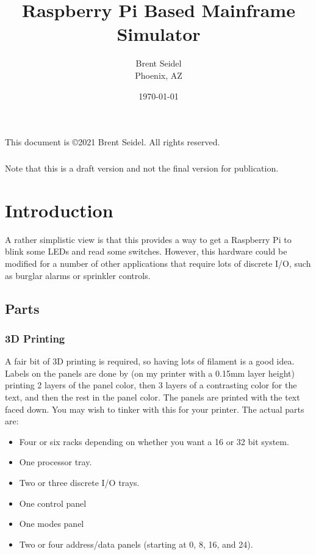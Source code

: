 \documentclass[10pt, openany]{book}
\title{Raspberry Pi Based Mainframe Simulator}
\author{Brent Seidel \\ Phoenix, AZ}
\date{ \today }
\begin{document}
%
%
\frontmatter
\maketitle
\begin{center}
This document is \copyright 2021 Brent Seidel.  All rights reserved.

\paragraph{}Note that this is a draft version and not the final version for publication.
\end{center}
\tableofcontents
\listoffigures
\listoftables

\mainmatter
\chapter{Introduction}
A rather simplistic view is that this provides a way to get a Raspberry Pi to blink some LEDs and read some switches.  However, this hardware could be modified for a number of other applications that require lots of discrete I/O, such as burglar alarms or sprinkler controls.

\section{Parts}
\subsection{3D Printing}
A fair bit of 3D printing is required, so having lots of filament is a good idea.  Labels on the panels are done by (on my printer with a 0.15mm layer height) printing 2 layers of the panel color, then 3 layers of a contrasting color for the text, and then the rest in the panel color.  The panels are printed with the text faced down.  You may wish to tinker with this for your printer.  The actual parts are:
\begin{itemize}
  \item Four or six racks depending on whether you want a 16 or 32 bit system.
  \item One processor tray.
  \item Two or three discrete I/O trays.
  \item One control panel
  \item One modes panel
  \item Two or four address/data panels (starting at 0, 8, 16, and 24).
\end{itemize}
\end{document}
